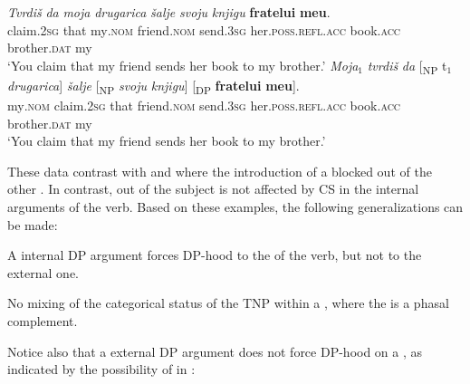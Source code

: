 \documentclass[output=paper,hidelinks,newtxmath,]{langscibook}
\begin{document}
\ea \label{15:ex30}
	\ea\label{15:ex30a}
    \gll \textit{Tvrdiš} \textit{da} \textit{moja} \textit{drugarica} \textit{šalje} \textit{svoju} \textit{knjigu} \textbf{fratelui} \textbf{meu}.\\          
         claim\textsc{.2sg} that my\textsc{.nom} friend\textsc{.nom} send\textsc{.3sg} her\textsc{.poss.refl.acc} book\textsc{.acc} brother\textsc{.dat} my\\
         \glt `You claim that my friend sends her book to my brother.'
	\ex\label{15:ex30b}
	 \gll \textit{Moja}$_1$ \textit{tvrdiš} \textit{da} [\textsubscript{NP} t$_1$ \textit{drugarica}] \textit{šalje}\hspace{3.5cm} [\textsubscript{NP} \textit{svoju} \textit{knjigu}] [\textsubscript{DP} \textbf{fratelui} \textbf{meu}].\\
         my\textsc{.nom} claim\textsc{.2sg} that {} {} friend\textsc{.nom} send\textsc{.3sg} {} her\textsc{.poss.refl.acc} book\textsc{.acc} {} brother\textsc{.dat} my\\ 
         \glt `You claim that my friend sends her book to my brother.'
	\z
\z

\noindent These data contrast with  and  where the introduction of a   blocked  out of the other . In contrast,  out of the subject is not affected by CS in the internal arguments of the verb. Based on these examples, the following generalizations can be made:

\ea\label{15:ex31}
  A  internal DP argument forces DP-hood to the  of the verb, but not to the external one.
\z

\ea\label{15:ex32}
  No mixing of the categorical status of the TNP within a , where the  is a phasal complement.
\z

\noindent Notice also that a  external DP argument does not force DP-hood on a  , as indicated by the possibility of  in :

\ea \label{15:ex33}
	\z
\z
\end{document}

